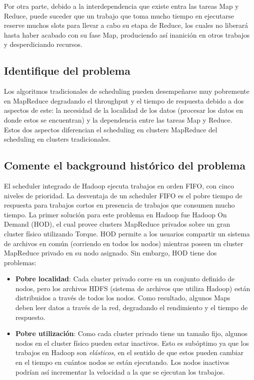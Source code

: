 Por otra parte, debido a la interdependencia que existe entra las tareas Map y Reduce, puede suceder que un trabajo que toma mucho tiempo en ejecutarse reserve muchos slots para llevar a cabo su etapa de Reduce, los cuales no liberará hasta haber acabado con su fase Map, produciendo así inanición en otros trabajos y desperdiciando recursos.


\subsection{Identifique del problema}

Los algoritmos tradicionales de scheduling pueden desempeñarse muy pobremente en MapReduce degradando el throughput y el tiempo de respuesta debido a dos aspectos de este: la necesidad de la localidad de los datos (procesar los datos en donde estos se encuentran) y la dependencia entre las tareas Map y Reduce. Estos dos aspectos diferencian el scheduling en clusters MapReduce del scheduling en clusters tradicionales. 


\subsection{Comente el background histórico del problema}

El scheduler integrado de Hadoop ejecuta trabajos en orden FIFO, con cinco niveles de prioridad. La desventaja de un scheduler FIFO es el pobre tiempo de respuesta para trabajos cortos en presencia de trabajos que consumen mucho tiempo. La primer solución para este problema en Hadoop fue Hadoop On Demand (HOD), el cual provee clusters MapReduce privados sobre un gran cluster físico utilizando Torque. HOD permite a los usuarios compartir un sistema de archivos en común (corriendo en todos los nodos) mientras poseen un cluster MapReduce privado en su nodo asignado. Sin embargo, HOD tiene dos problemas:
\begin{itemize}
	\item \textbf{Pobre localidad}: Cada cluster privado corre en un conjunto definido de nodos, pero los archivos HDFS (sistema de archivos que utiliza Hadoop) están distribuidos a través de todos los nodos. Como resultado, algunos Maps deben leer datos a través de la red, degradando el rendimiento y el tiempo de respuesto.
	\item \textbf{Pobre utilización}: Como cada cluster privado tiene un tamaño fijo, algunos nodos en el cluster físico pueden estar inactivos. Esto es subóptimo ya que los trabajos en Hadoop son \textit{elásticos}, en el sentido de que estos pueden cambiar en el tiempo en cuántos nodos se están ejecutando. Los nodos inactivos podrían así incrementar la velocidad a la que se ejecutan los trabajos.
\end{itemize}


